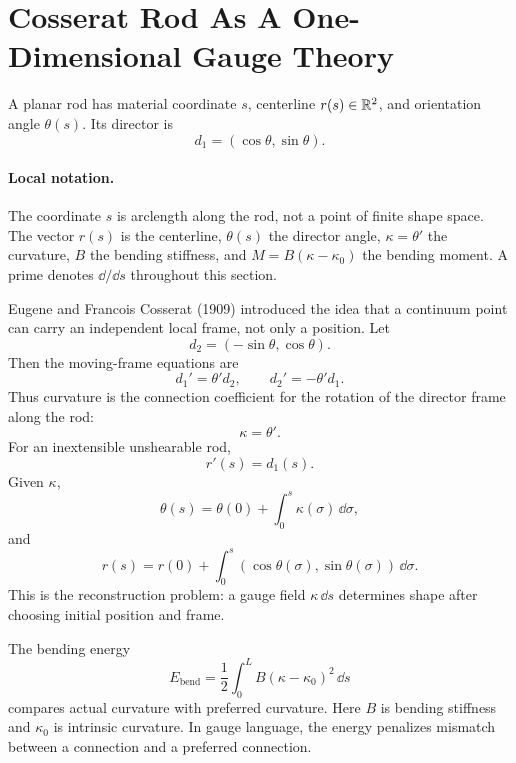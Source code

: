 \section{Cosserat Rod As A One-Dimensional Gauge Theory}
\label{sec:cosserat-rod}

A planar rod has material coordinate \(s\), centerline \(r(s)\in\mathbb{R}^2\), and
orientation angle \(\theta(s)\). Its director is
\[
  d_1=(\cos\theta,\sin\theta).
\]

\paragraph{Local notation.}
The coordinate \(s\) is arclength along the rod, not a point of finite
shape space.  The vector \(r(s)\) is the centerline, \(\theta(s)\) the director
angle, \(\kappa=\theta'\) the curvature, \(B\) the bending stiffness, and
\(M=B(\kappa-\kappa_0)\) the bending moment.  A prime denotes
\(\dd/\dd s\) throughout this section.

Eugene and Francois Cosserat (1909) introduced the idea that a continuum point
can carry an independent local frame, not only a position.
Let
\[
  d_2=(-\sin\theta,\cos\theta).
\]
Then the moving-frame equations are
\[
  d_1'=\theta' d_2,\qquad d_2'=-\theta' d_1.
\]
Thus curvature is the connection coefficient for the rotation of the director
frame along the rod:
\[
  \kappa=\theta'.
\]
For an inextensible unshearable rod,
\[
  r'(s)=d_1(s).
\]
Given \(\kappa\),
\[
  \theta(s)=\theta(0)+\int_0^s\kappa(\sigma)\,\dd\sigma,
\]
and
\[
  r(s)=r(0)+\int_0^s
  (\cos\theta(\sigma),\sin\theta(\sigma))\,\dd\sigma.
\]
This is the reconstruction problem: a gauge field \(\kappa\,\dd s\) determines
shape after choosing initial position and frame.

The bending energy
\[
  E_{\mathrm{bend}}
  =
  \frac12\int_0^L B(\kappa-\kappa_0)^2\,\dd s
\]
compares actual curvature with preferred curvature. Here \(B\) is bending
stiffness and \(\kappa_0\) is intrinsic curvature. In gauge language, the
energy penalizes mismatch between a connection and a preferred connection.

